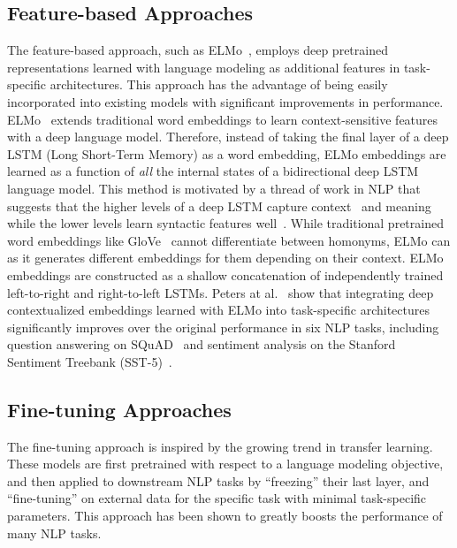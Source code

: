 \subsection{Feature-based Approaches}

The feature-based approach, such as ELMo~\cite{peters2018deep}, employs deep pretrained representations learned with language modeling as additional features in task-specific architectures.
This approach has the advantage of being easily incorporated into existing models with significant improvements in performance.
ELMo~\cite{peters2018deep} extends traditional word embeddings to learn context-sensitive features with a deep language model.
Therefore, instead of taking the final layer of a deep LSTM (Long Short-Term Memory) as a word embedding, ELMo embeddings are learned as a function of \textit{all} the internal states of a bidirectional deep LSTM language model.
This method is motivated by a thread of work in NLP that suggests that the higher levels of a deep LSTM capture context~\cite{melamud2016context2vec} and meaning while the lower levels learn syntactic features well~\cite{belinkov2017neural}.
While traditional pretrained word embeddings like GloVe~\cite{pennington2014glove} cannot differentiate between homonyms, ELMo can as it generates different embeddings for them depending on their context.
ELMo embeddings are constructed as a shallow concatenation of independently trained left-to-right and right-to-left LSTMs.
Peters at al.~\cite{peters2018deep} show that integrating deep contextualized embeddings learned with ELMo into task-specific architectures significantly improves over the original performance in six NLP tasks, including question answering on SQuAD~\cite{rajpurkar2016squad} and sentiment analysis on the Stanford Sentiment Treebank (SST-5)~\cite{socher2013recursive}.

\subsection{Fine-tuning Approaches}

The fine-tuning approach is inspired by the growing trend in transfer learning.
These models are first pretrained with respect to a language modeling objective, and then applied to downstream NLP tasks by ``freezing'' their last layer, and ``fine-tuning'' on external data for the specific task with minimal task-specific parameters.
This approach has been shown to greatly boosts the performance of many NLP tasks.

